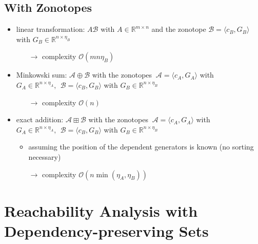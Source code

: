 \documentclass{article}
\begin{document}
\subsection{With Zonotopes}
\begin{itemize}
    \item linear transformation: $A\mathcal{B}$ with $A\in \mathbb{R}^{m \times n}$ and the zonotope $\mathcal{B}=\langle c_B, G_B\rangle$ with $G_B\in \mathbb{R}^{n \times \eta_B}$
    \begin{itemize}
        \item[$\rightarrow$] complexity $\mathcal{O}(mn\eta_B)$
    \end{itemize}
    \item Minkowski sum: $\mathcal{A}\oplus\mathcal{B}$ with the zonotopes $~\mathcal{A}=\langle c_A, G_A\rangle$ with $G_A\in \mathbb{R}^{n \times \eta_A},~~\mathcal{B}=\langle c_B, G_B\rangle$ with $G_B\in \mathbb{R}^{n \times \eta_B}$
    \begin{itemize}
        \item[$\rightarrow$] complexity $\mathcal{O}(n)$
    \end{itemize}   
    \item exact addition: $\mathcal{A}\boxplus\mathcal{B}$ with the zonotopes $~\mathcal{A}=\langle c_A, G_A\rangle$ with $G_A\in \mathbb{R}^{n \times \eta_A},~~\mathcal{B}=\langle c_B, G_B\rangle$ with $G_B\in \mathbb{R}^{n \times \eta_B}$
    \begin{itemize}
        \item assuming the position of the dependent generators is known (no sorting necessary)
        \item[$\rightarrow$] complexity $\mathcal{O}(n \min(\eta_A,\eta_B))$
    \end{itemize}    
\end{itemize}

\newpage
\section{Reachability Analysis with Dependency-preserving Sets} \label{sec:meth1}
\end{document}
